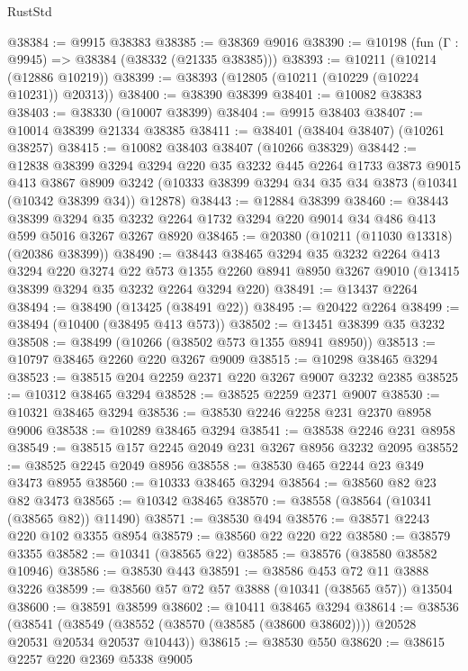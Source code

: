 \begin{lexlean}{RustStd}
\begin{coremodule}
@38384 := @9915 @38383
@38385 := @38369 @9016
@38390 := @10198 (fun (Γ : @9945) => @38384 (@38332 (@21335 @38385)))
@38393 := @10211 (@10214 (@12886 @10219))
@38399 := @38393 (@12805 (@10211 (@10229 (@10224 @10231)) @20313))
@38400 := @38390 @38399
@38401 := @10082 @38383
@38403 := @38330 (@10007 @38399)
@38404 := @9915 @38403
@38407 := @10014 @38399 @21334 @38385
@38411 := @38401 (@38404 @38407) (@10261 @38257)
@38415 := @10082 @38403 @38407 (@10266 @38329)
@38442 := @12838
    @38399
    @3294
    @3294
    @220
    @35
    @3232
    @445
    @2264
    @1733
    @3873
    @9015
    @413
    @3867
    @8909
    @3242
    (@10333 @38399 @3294 @34 @35 @34 @3873 (@10341 (@10342 @38399 @34)) @12878)
@38443 := @12884 @38399
@38460 := @38443
    @38399
    @3294
    @35
    @3232
    @2264
    @1732
    @3294
    @220
    @9014
    @34
    @486
    @413
    @599
    @5016
    @3267
    @3267
    @8920
@38465 := @20380 (@10211 (@11030 @13318) (@20386 @38399))
@38490 := @38443
    @38465
    @3294
    @35
    @3232
    @2264
    @413
    @3294
    @220
    @3274
    @22
    @573
    @1355
    @2260
    @8941
    @8950
    @3267
    @9010
    (@13415 @38399 @3294 @35 @3232 @2264 @3294 @220)
@38491 := @13437 @2264
@38494 := @38490 (@13425 (@38491 @22))
@38495 := @20422 @2264
@38499 := @38494 (@10400 (@38495 @413 @573))
@38502 := @13451 @38399 @35 @3232
@38508 := @38499 (@10266 (@38502 @573 @1355 @8941 @8950))
@38513 := @10797 @38465 @2260 @220 @3267 @9009
@38515 := @10298 @38465 @3294
@38523 := @38515 @204 @2259 @2371 @220 @3267 @9007 @3232 @2385
@38525 := @10312 @38465 @3294
@38528 := @38525 @2259 @2371 @9007
@38530 := @10321 @38465 @3294
@38536 := @38530 @2246 @2258 @231 @2370 @8958 @9006
@38538 := @10289 @38465 @3294
@38541 := @38538 @2246 @231 @8958
@38549 := @38515 @157 @2245 @2049 @231 @3267 @8956 @3232 @2095
@38552 := @38525 @2245 @2049 @8956
@38558 := @38530 @465 @2244 @23 @349 @3473 @8955
@38560 := @10333 @38465 @3294
@38564 := @38560 @82 @23 @82 @3473
@38565 := @10342 @38465
@38570 := @38558 (@38564 (@10341 (@38565 @82)) @11490)
@38571 := @38530 @494
@38576 := @38571 @2243 @220 @102 @3355 @8954
@38579 := @38560 @22 @220 @22
@38580 := @38579 @3355
@38582 := @10341 (@38565 @22)
@38585 := @38576 (@38580 @38582 @10946)
@38586 := @38530 @443
@38591 := @38586 @453 @72 @11 @3888 @3226
@38599 := @38560 @57 @72 @57 @3888 (@10341 (@38565 @57)) @13504
@38600 := @38591 @38599
@38602 := @10411 @38465 @3294
@38614 := @38536
    (@38541 (@38549 (@38552 (@38570 (@38585 (@38600 @38602)))) @20528 @20531 @20534 @20537 @10443))
@38615 := @38530 @550
@38620 := @38615 @2257 @220 @2369 @5338 @9005

\end{coremodule}
\end{lexlean}
